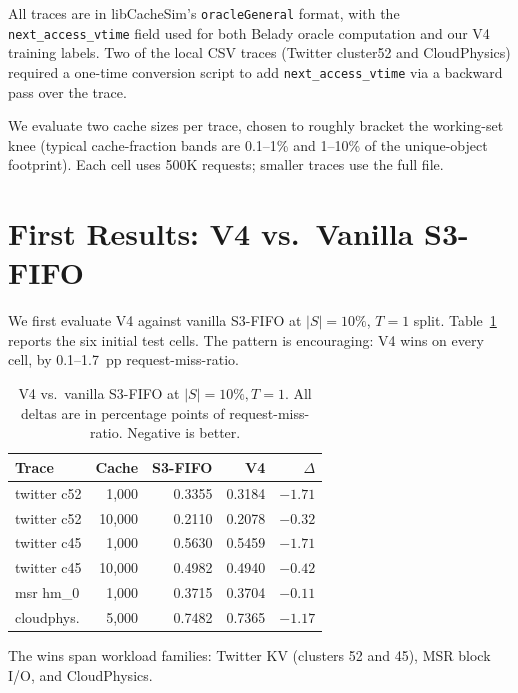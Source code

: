 \documentclass[letterpaper,twocolumn,10pt]{article}
\begin{document}
All traces are in libCacheSim's \texttt{oracleGeneral} format, with
the \texttt{next\_access\_vtime} field used for both Belady oracle
computation and our V4 training labels. Two of the local CSV traces
(Twitter cluster52 and CloudPhysics) required a one-time
conversion script to add \texttt{next\_access\_vtime} via a backward
pass over the trace.
 
We evaluate two cache sizes per trace, chosen to roughly bracket
the working-set knee (typical cache-fraction bands are 0.1--1\%
and 1--10\% of the unique-object footprint). Each cell uses 500K
requests; smaller traces use the full file.

\section{First Results: V4 vs.\ Vanilla S3-FIFO}
\label{sec:eval}
 
We first evaluate V4 against vanilla S3-FIFO at
$|S| = 10\%$, $T = 1$ split. Table~\ref{tab:initial} reports the
six initial test cells. The pattern is encouraging: V4 wins on every
cell, by 0.1--1.7~pp request-miss-ratio.
 
\begin{table}[t]
\small
\centering
\setlength{\tabcolsep}{2pt}
\begin{tabular}{lrrrr}
\toprule
Trace & Cache & S3-FIFO & V4 & $\Delta$ \\
\midrule
twitter c52 & 1{,}000 & 0.3355 & 0.3184 & $-1.71$ \\
twitter c52 & 10{,}000 & 0.2110 & 0.2078 & $-0.32$ \\
twitter c45 & 1{,}000 & 0.5630 & 0.5459 & $-1.71$ \\
twitter c45 & 10{,}000 & 0.4982 & 0.4940 & $-0.42$ \\
msr hm\_0 & 1{,}000 & 0.3715 & 0.3704 & $-0.11$ \\
cloudphys. & 5{,}000 & 0.7482 & 0.7365 & $-1.17$ \\
\bottomrule
\end{tabular}
\caption{V4 vs.\ vanilla S3-FIFO at $|S|=10\%, T=1$. All deltas are
in percentage points of request-miss-ratio. Negative is better.}
\label{tab:initial}
\end{table}
 
The wins span workload families: Twitter KV (clusters 52 and 45),
MSR block I/O, and CloudPhysics. 
 
\end{document}
